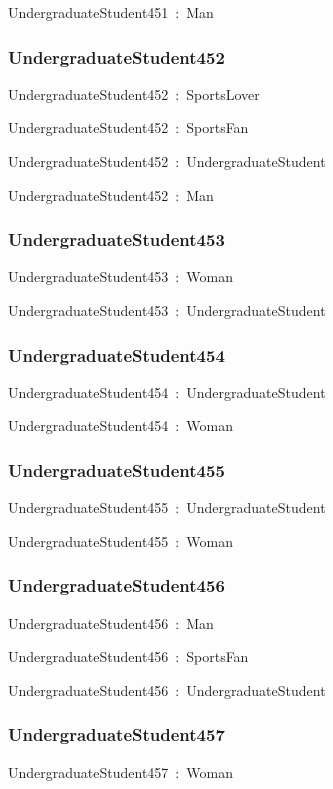 \documentclass{article}
\begin{document}
UndergraduateStudent451~:~Man

\subsubsection*{UndergraduateStudent452}

UndergraduateStudent452~:~SportsLover

UndergraduateStudent452~:~SportsFan

UndergraduateStudent452~:~UndergraduateStudent

UndergraduateStudent452~:~Man

\subsubsection*{UndergraduateStudent453}

UndergraduateStudent453~:~Woman

UndergraduateStudent453~:~UndergraduateStudent

\subsubsection*{UndergraduateStudent454}

UndergraduateStudent454~:~UndergraduateStudent

UndergraduateStudent454~:~Woman

\subsubsection*{UndergraduateStudent455}

UndergraduateStudent455~:~UndergraduateStudent

UndergraduateStudent455~:~Woman

\subsubsection*{UndergraduateStudent456}

UndergraduateStudent456~:~Man

UndergraduateStudent456~:~SportsFan

UndergraduateStudent456~:~UndergraduateStudent

\subsubsection*{UndergraduateStudent457}

UndergraduateStudent457~:~Woman
\end{document}
